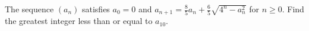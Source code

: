 The sequence $ (a_n)$ satisfies $ a_0 = 0$ and $ \displaystyle a_{n + 1} = \frac85a_n + \frac65\sqrt {4^n - a_n^2}$ for $ n\ge0$. Find the greatest integer less than or equal to $ a_{10}$.